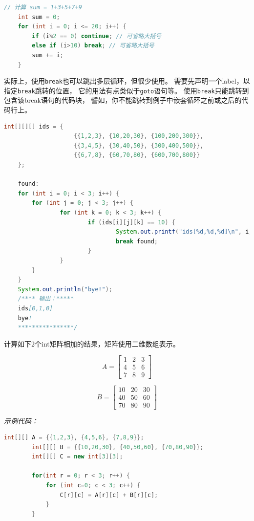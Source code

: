 \begin{lstlisting}[language=Java]
	// 计算 sum = 1+3+5+7+9
	int sum = 0;
	for (int i = 0; i <= 20; i++) {
		if (i%2 == 0) continue; // 可省略大括号
		else if (i>10) break; // 可省略大括号
		sum += i;
	}
\end{lstlisting}

实际上，使用\lstinline{break}也可以跳出多层循环，但很少使用。
需要先声明一个label，以指定\lstinline{break}跳转的位置，
它的用法有点类似于\lstinline{goto}语句等。
使用\lstinline{break}只能跳转到包含该break语句的代码块，
譬如，你不能跳转到例子中嵌套循环之前或之后的代码行上。
\bigskip

\begin{lstlisting}[language=Java]
	int[][][] ids = {
					{{1,2,3}, {10,20,30}, {100,200,300}},
					{{3,4,5}, {30,40,50}, {300,400,500}},
					{{6,7,8}, {60,70,80}, {600,700,800}}
	};

	found: 
	for (int i = 0; i < 3; i++) {
		for (int j = 0; j < 3; j++) {
				for (int k = 0; k < 3; k++) {
						if (ids[i][j][k] == 10) {
								System.out.printf("ids[%d,%d,%d]\n", i, j, k);
								break found;
						}
				}
		}
	}
	System.out.println("bye!");
	/**** 输出：*****
	ids[0,1,0]
	bye!
	****************/
\end{lstlisting}
\bigskip

\begin{example}
	计算如下2个int矩阵相加的结果，矩阵使用二维数组表示。\\
	\begin{minipage}{0.3\textwidth}
		$$
		A = \left[
		\begin{matrix}
			1 & 2 & 3 \\
			4 & 5 & 6 \\
			7 & 8 & 9
			\end{matrix}
			\right]
		$$
	\end{minipage}
	\begin{minipage}{0.3\textwidth}
		$$
		B = \left[
		\begin{matrix}
			10 & 20 & 30 \\
			40 & 50 & 60 \\
			70 & 80 & 90
			\end{matrix}
			\right]
		$$
	\end{minipage}
	\bigskip

	\noindent \emph{示例代码：}
	\begin{lstlisting}[language=Java]
		int[][] A = {{1,2,3}, {4,5,6}, {7,8,9}};
		int[][] B = {{10,20,30}, {40,50,60}, {70,80,90}};
		int[][] C = new int[3][3];

		for(int r = 0; r < 3; r++) {
			for (int c=0; c < 3; c++) {
				C[r][c] = A[r][c] + B[r][c];
			}
		}
	\end{lstlisting}

\end{example}

